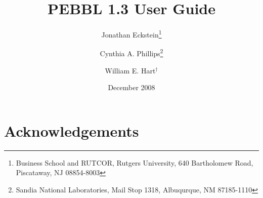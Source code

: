 \documentclass[12pt]{article}
\begin{document}
\title{
PEBBL 1.3 User Guide
}

\author{
Jonathan Eckstein\thanks{
Business School and RUTCOR, Rutgers University,
640 Bartholomew Road, Piscataway, NJ 08854-8003
}
\and
Cynthia A. Phillips\thanks{
Sandia National Laboratories, Mail Stop 1318, Albuqurque, NM 87185-1110}
\and
William E. Hart$^{\dagger}$
}

\date{December 2008}

\maketitle

\begin{abstract}

\end{abstract}

\newpage

\tableofcontents

\newpage



\section*{Acknowledgements}





\end{document}
